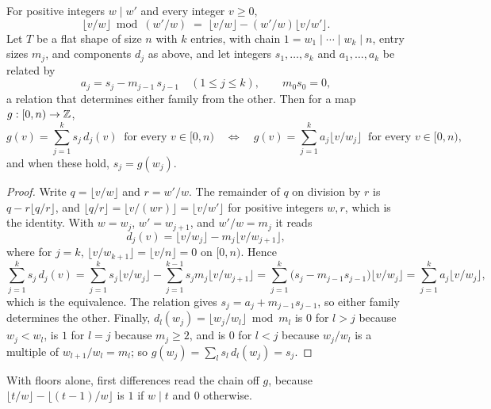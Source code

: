 \begin{lemma}\label{lem:floor}
For positive integers $w \mid w'$ and every integer $v \ge 0$,
\[
\lfloor v/w \rfloor \bmod (w'/w) \;=\;
\lfloor v/w \rfloor - (w'/w)\lfloor v/w' \rfloor .
\]
Let $T$ be a flat shape of size $n$ with $k$ entries, with chain
$1 = w_1 \mid \cdots \mid w_k \mid n$, entry sizes $m_j$, and components
$d_j$ as above, and let integers $s_1,\dots,s_k$ and $a_1,\dots,a_k$ be
related by
\[
a_j = s_j - m_{j-1}\,s_{j-1} \quad (1 \le j \le k), \qquad m_0 s_0 = 0,
\]
a relation that determines either family from the other. Then for a map
$g : [0,n) \to \mathbb{Z}$,
\[
g(v) = \sum_{j=1}^{k} s_j\, d_j(v) \ \text{ for every } v \in [0,n)
\quad\Longleftrightarrow\quad
g(v) = \sum_{j=1}^{k} a_j \lfloor v/w_j \rfloor \ \text{ for every } v \in [0,n),
\]
and when these hold, $s_j = g(w_j)$.
\end{lemma}
\begin{proof}
Write $q = \lfloor v/w \rfloor$ and $r = w'/w$. The remainder of $q$ on
division by $r$ is $q - r\lfloor q/r \rfloor$, and $\lfloor q/r \rfloor =
\lfloor v/(wr) \rfloor = \lfloor v/w' \rfloor$ for positive integers $w, r$,
which is the identity. With $w = w_j$, $w' = w_{j+1}$, and $w'/w = m_j$ it
reads
\[
d_j(v) = \lfloor v/w_j \rfloor - m_j \lfloor v/w_{j+1} \rfloor,
\]
where for $j = k$, $\lfloor v/w_{k+1} \rfloor = \lfloor v/n \rfloor = 0$ on
$[0,n)$. Hence
\[
\sum_{j=1}^{k} s_j\, d_j(v)
= \sum_{j=1}^{k} s_j \lfloor v/w_j \rfloor
  - \sum_{j=1}^{k-1} s_j m_j \lfloor v/w_{j+1} \rfloor
= \sum_{j=1}^{k} \big(s_j - m_{j-1}s_{j-1}\big) \lfloor v/w_j \rfloor
= \sum_{j=1}^{k} a_j \lfloor v/w_j \rfloor ,
\]
which is the equivalence. The relation gives $s_j = a_j + m_{j-1}s_{j-1}$,
so either family determines the other. Finally,
$d_l(w_j) = \lfloor w_j/w_l \rfloor \bmod m_l$ is $0$ for $l > j$ because
$w_j < w_l$, is $1$ for $l = j$ because $m_j \ge 2$, and is $0$ for $l < j$
because $w_j/w_l$ is a multiple of $w_{l+1}/w_l = m_l$; so
$g(w_j) = \sum_l s_l\, d_l(w_j) = s_j$.
\end{proof}

With floors alone, first differences read the chain off $g$, because
$\lfloor t/w \rfloor - \lfloor (t-1)/w \rfloor$ is $1$ if $w \mid t$ and $0$
otherwise.

